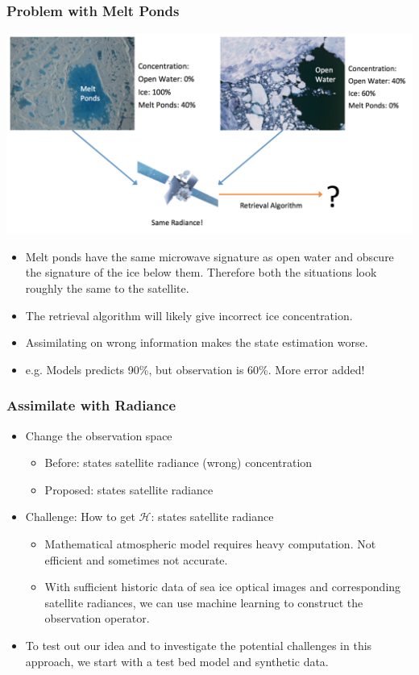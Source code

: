 \documentclass{beamer}
\newcommand{\cH}{\mathcal{H}}
\begin{document}
\begin{frame}
\frametitle{Problem with Melt Ponds}
\centering
\includegraphics[width=0.8\linewidth]{Figures/MeltPondsProblem.png}
\begin{itemize}
	\item Melt ponds have the same microwave signature as open water and obscure the signature of the ice below them. Therefore both the situations look roughly the same to the satellite.
	\item The retrieval algorithm will likely give incorrect ice concentration.
	\item Assimilating on wrong information makes the state estimation worse.
	\item e.g. Models predicts 90\%, but observation is 60\%. More error added!
\end{itemize}

\end{frame}

\begin{frame}
\frametitle{Assimilate with Radiance}
\begin{itemize}
	\item Change the observation space
	\begin{itemize}
		\item Before: states {\textrightarrow} satellite radiance {\textrightarrow} (wrong) concentration
		\item Proposed: states {\textrightarrow} satellite radiance
	\end{itemize}
	\item Challenge: How to get $\cH$: states {\textrightarrow} satellite radiance
	\begin{itemize}
		\item Mathematical atmospheric model requires heavy computation. Not efficient and sometimes not accurate.
		\item With sufficient historic data of sea ice optical images and corresponding satellite radiances, we can use machine learning to construct the observation operator.
	\end{itemize}
	\item To test out our idea and to investigate the potential challenges in this approach, we start with a test bed model and synthetic data.
\end{itemize}
\end{frame}
\end{document}
